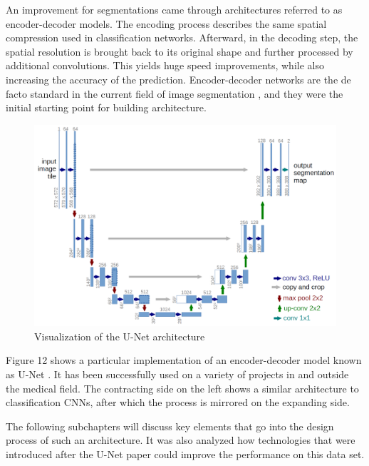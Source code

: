 An improvement for segmentations came through architectures referred to as encoder-decoder models. The encoding process describes the same spatial compression used in classification networks. Afterward, in the decoding step, the spatial resolution is brought back to its original shape and further processed by additional convolutions. This yields huge speed improvements, while also increasing the accuracy of the prediction. Encoder-decoder networks are the de facto standard in the current field of image segmentation \cite{Chen2017}\cite{Zhao2016}\cite{Lin2016}\cite{Chen2016}\cite{Nekrasov2016}\cite{Milletari2016}\cite{Cicek2016}\cite{Ronneberger2015a}\cite{Badrinarayanan2015}, and they were the initial starting point for building architecture.

\begin{figure}[H]
\centering
\par
\includegraphics[width=1.0\textwidth]{imgs/unet.png}
\caption{Visualization of the U-Net architecture}
\par
\end{figure}

Figure 12 shows a particular implementation of an encoder-decoder model known as U-Net \cite{Ronneberger2015a}. It has been successfully used on a variety of projects in and outside the medical field. The contracting side on the left shows a similar architecture to classification CNNs, after which the process is mirrored on the expanding side.

The following subchapters will discuss key elements that go into the design process of such an architecture. It was also analyzed how technologies that were introduced after the U-Net paper could improve the performance on this data set.

